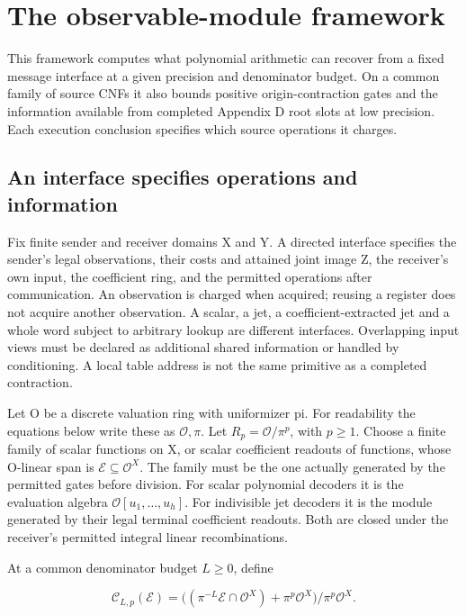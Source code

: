 \documentclass[
  11pt,
]{article}
\begin{document}
\section{The observable-module framework}\label{v8-section-framework}

This framework computes what polynomial arithmetic can recover from a
fixed message interface at a given precision and denominator budget. On
a common family of source CNFs it also bounds positive
origin-contraction gates and the information available from completed
Appendix D root slots at low precision. Each execution conclusion
specifies which source operations it charges.

\subsection{An interface specifies operations and
information}\label{v8-an-interface-specifies-operations-and-information}

Fix finite sender and receiver domains X and Y. A directed interface
specifies the sender's legal observations, their costs and attained
joint image Z, the receiver's own input, the coefficient ring, and the
permitted operations after communication. An observation is charged when
acquired; reusing a register does not acquire another observation. A
scalar, a jet, a coefficient-extracted jet and a whole word subject to
arbitrary lookup are different interfaces. Overlapping input views must
be declared as additional shared information or handled by conditioning.
A local table address is not the same primitive as a completed
contraction.

Let O be a discrete valuation ring with uniformizer pi. For readability
the equations below write these as \(\mathcal O,\pi\). Let
\(R_p=\mathcal O/\pi^p\), with \(p\ge1\). Choose a finite family of
scalar functions on X, or scalar coefficient readouts of functions,
whose O-linear span is \(\mathcal E\subseteq\mathcal O^X\). The family
must be the one actually generated by the permitted gates before
division. For scalar polynomial decoders it is the evaluation algebra
\(\mathcal O[u_1,\ldots,u_h]\). For indivisible jet decoders it is the
module generated by their legal terminal coefficient readouts. Both are
closed under the receiver's permitted integral linear recombinations.

At a common denominator budget \(L\ge0\), define

\[
 \mathcal C_{L,p}(\mathcal E)=
 \big((\pi^{-L}\mathcal E\cap\mathcal O^X)+\pi^p\mathcal O^X\big)
                /\pi^p\mathcal O^X. \tag{U1}
\]
\end{document}
